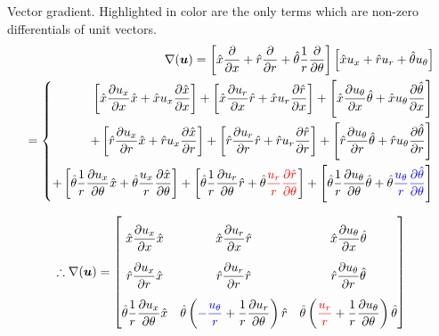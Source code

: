 \documentclass{kthreport}
\begin{document}
Vector gradient. Highlighted in color are the only terms which are non-zero differentials of unit vectors.
\begin{eqnarray}
	\nabla(\bm{u}) = \left[\hat{x}\frac{\partial}{\partial x} + \hat{r}\frac{\partial}{\partial r} + \hat{\theta}\frac{1}{r}\frac{\partial}{\partial \theta} \right]\left[\hat{x}u_{x} + \hat{r}u_{r} + \hat{\theta}u_{\theta}\right] \nonumber \\
	= \left\{\begin{split}
	\left[\hat{x}\frac{\partial u_{x}}{\partial x} \hat{x} + \hat{x}u_{x}\frac{\partial \hat{x}}{\partial x} \right] 
	+ \left[\hat{x}\frac{\partial u_{r}}{\partial x}\hat{r} + \hat{x}u_{r}\frac{\partial \hat{r}}{\partial x} \right] 
	+ \left[\hat{x}\frac{\partial u_{\theta}}{\partial x}\hat{\theta}	+ \hat{x}u_{\theta}\frac{\partial \hat{\theta}}{\partial x}\right] \\
	+ \left[\hat{r}\frac{\partial u_{x}}{\partial r}\hat{x} + \hat{r}u_{x}\frac{\partial \hat{x}}{\partial r} \right] 
	+ \left[\hat{r}\frac{\partial u_{r}}{\partial r}\hat{r} + \hat{r}u_{r}\frac{\partial \hat{r}}{\partial r} \right] 
	+ \left[\hat{r}\frac{\partial u_{\theta}}{\partial r}\hat{\theta} + \hat{r}u_{\theta}\frac{\partial \hat{\theta}}{\partial r}\right] \\
	+ \left[\hat{\theta}\frac{1}{r}\frac{\partial u_{x}}{\partial \theta}\hat{x} + 	\hat{\theta}\frac{u_{x}}{r}\frac{\partial \hat{x}}{\partial \theta}\right]
	+ \left[\hat{\theta}\frac{1}{r}\frac{\partial u_{r}}{\partial \theta}\hat{r} + 	\hat{\theta}\color{red}{\frac{u_{r}}{r}\frac{\partial \hat{r}}{\partial \theta}} \color{black} \right]
	+ \left[\hat{\theta}\frac{1}{r}\frac{\partial u_{\theta}}{\partial \theta}\hat{\theta} +  \hat{\theta}\color{blue}{\frac{u_{\theta}}{r}\frac{\partial \hat{\theta}}{\partial \theta}} \color{black}\right]
	\end{split}\right.
%	
\end{eqnarray}

\begin{eqnarray}
	\def\arraystretch{2.5}
	\therefore \nabla(\bm{u}) = 
	\begin{bmatrix}
		\hat{x}\dfrac{\partial u_{x}}{\partial x}\hat{x} & \hat{x}\dfrac{\partial u_{r}}{\partial x}\hat{r}   &  \hat{x}\dfrac{\partial u_{\theta}}{\partial x}\hat{\theta} \\
		\hat{r}\dfrac{\partial u_{x}}{\partial r}\hat{x}  & \hat{r}\dfrac{\partial u_{r}}{\partial r}\hat{r}	&   \hat{r}\dfrac{\partial u_{\theta}}{\partial r}\hat{\theta}\\
		\hat{\theta}\dfrac{1}{r}\dfrac{\partial u_{x}}{\partial \theta}\hat{x} & \hat{\theta}\left(\color{blue}{-\dfrac{u_{\theta}}{r}} \color{black} + \dfrac{1}{r}\dfrac{\partial u_{r}}{\partial \theta} \right)\hat{r} 	& \hat{\theta}\left( \color{red}{\dfrac{u_{r}}{r}} \color{black} +\dfrac{1}{r} \dfrac{\partial u_{\theta}}{\partial \theta} \right)\hat{\theta}
	\end{bmatrix}
\end{eqnarray}
\end{document}

